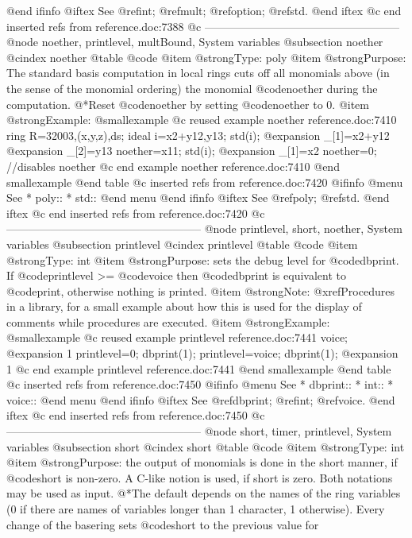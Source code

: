 {{{{{{{{@end ifinfo
@iftex
See
@ref{int};
@ref{mult};
@ref{option};
@ref{std}.
@end iftex
@c end inserted refs from reference.doc:7388
@c -----------------------------------------------------
@node noether, printlevel, multBound, System variables
@subsection noether
@cindex noether
@table @code
@item @strong{Type:}
poly
@item @strong{Purpose:}
The standard basis computation in local rings
cuts off  all monomials above
(in the sense of the monomial ordering)
the monomial @code{noether} during the computation.
@*Reset @code{noether} by setting @code{noether} to 0.
@item @strong{Example:}
@smallexample
@c reused example noether reference.doc:7410 
  ring R=32003,(x,y,z),ds;
  ideal i=x2+y12,y13;
  std(i);
@expansion{} _[1]=x2+y12
@expansion{} _[2]=y13
  noether=x11;
  std(i);
@expansion{} _[1]=x2
  noether=0; //disables noether
@c end example noether reference.doc:7410
@end smallexample
@end table
@c inserted refs from reference.doc:7420
@ifinfo
@menu
See
* poly::
* std::
@end menu
@end ifinfo
@iftex
See
@ref{poly};
@ref{std}.
@end iftex
@c end inserted refs from reference.doc:7420
@c -----------------------------------------------------
@node printlevel, short, noether, System variables
@subsection printlevel
@cindex printlevel
@table @code
@item @strong{Type:}
int
@item @strong{Purpose:}
sets the debug level for @code{dbprint}.
If @code{printlevel} >= @code{voice} then @code{dbprint} is equivalent to
@code{print}, otherwise nothing is printed.
@item @strong{Note:}
@xref{Procedures in a library}, for a small example about how this
is used for the display of comments while procedures are executed.
@item @strong{Example:}
@smallexample
@c reused example printlevel reference.doc:7441 
  voice;
@expansion{} 1
  printlevel=0;
  dbprint(1);
  printlevel=voice;
  dbprint(1);
@expansion{} 1
@c end example printlevel reference.doc:7441
@end smallexample
@end table
@c inserted refs from reference.doc:7450
@ifinfo
@menu
See
* dbprint::
* int::
* voice::
@end menu
@end ifinfo
@iftex
See
@ref{dbprint};
@ref{int};
@ref{voice}.
@end iftex
@c end inserted refs from reference.doc:7450
@c -----------------------------------------------------
@node short, timer, printlevel, System variables
@subsection short
@cindex short
@table @code
@item @strong{Type:}
int
@item @strong{Purpose:}
the output of monomials is done in the short manner,
if @code{short} is non-zero. A C-like notion is used, if short is zero.
Both notations may be used as input.
@*The default depends on the names of the ring variables
(0 if there are names of variables longer than 1 character, 1 otherwise). Every
change of the basering sets @code{short} to the previous value for
}}}}}}}}
